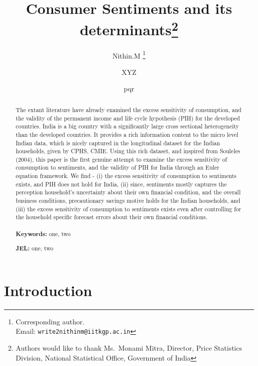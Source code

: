 \documentclass[
  a4paper,
  abstract]{scrartcl}
\title{Consumer Sentiments and its determinants\thanks{Authors would
like to thank Ms.~Monami Mitra, Director, Price Statistics Division,
National Statistical Office, Government of India}}
\author[1]{Nithin.M%
\thanks{Corresponding author.\\ Email: \texttt{write2nithinm@iitkgp.ac.in}}%
   }
\author[2]{XYZ%
   }
\author[1, 2]{pqr%
   }
\affil[1]{
      Department of Humanities and Social Sciences, IIT Kharagpur
  }
\affil[2]{
      University of Hyderabad
  }
\date{}
\begin{document}
\maketitle

\begin{abstract}
The extant literature have already examined the excess sensitivity of
consumption, and the validity of the permanent income and life cycle
hypothesis (PIH) for the developed countries. India is a big country
with a significantly large cross sectional heterogeneity than the
developed countries. It provides a rich information content to the micro
level Indian data, which is nicely captured in the longitudinal dataset
for the Indian households, given by CPHS, CMIE. Using this rich dataset,
and inspired from Souleles (2004), this paper is the first genuine
attempt to examine the excess sensitivity of consumption to sentiments,
and the validity of PIH for India through an Euler equation framework.
We find - (i) the excess sensitivity of consumption to sentiments
exists, and PIH does not hold for India, (ii) since, sentiments mostly
captures the perception household's uncertainty about their own
financial condition, and the overall business conditions, precautionary
savings motive holds for the Indian households, and (iii) the excess
sensitivity of consumption to sentiments exists even after controlling
for the household specific forecast errors about their own financial
conditions. %
\\
\\
\noindent%
\textbf{Keywords:} one, two %
 
\noindent%
\textbf{JEL:} one, two
\end{abstract}


\newpage

\section{Introduction}\label{sec-1}
\end{document}
